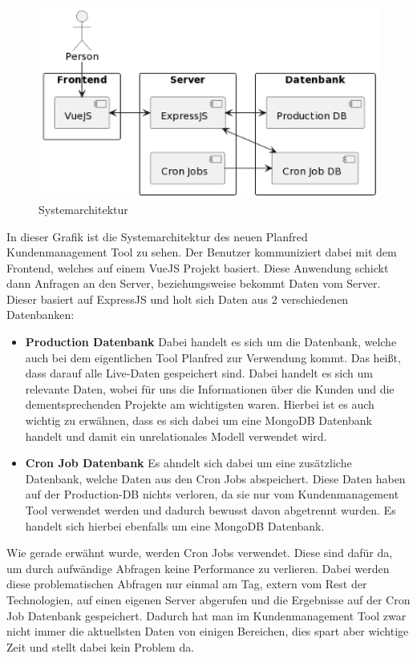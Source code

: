 \begin{figure}[h!]
    \centering
    \includegraphics[width=1\textwidth]{pics/diplomarbeit-architektur.png}
    \caption{Systemarchitektur}
    \label{fig:mesh1}
\end{figure}

In dieser Grafik ist die Systemarchitektur des neuen Planfred Kundenmanagement Tool zu sehen. Der Benutzer kommuniziert dabei mit dem Frontend, welches auf einem VueJS Projekt basiert. Diese Anwendung schickt dann Anfragen an den Server, beziehungsweise bekommt Daten vom Server. Dieser basiert auf ExpressJS und holt sich Daten aus 2 verschiedenen Datenbanken:

\begin{itemize}
    \item \textbf{Production Datenbank}
        \newline
        Dabei handelt es sich um die Datenbank, welche auch bei dem eigentlichen Tool Planfred zur Verwendung kommt. Das heißt, dass darauf alle Live-Daten gespeichert sind. Dabei handelt es sich um relevante Daten, wobei für uns die Informationen über die Kunden und die dementsprechenden Projekte am wichtigsten waren.
        Hierbei ist es auch wichtig zu erwähnen, dass es sich dabei um eine MongoDB Datenbank handelt und damit ein unrelationales Modell verwendet wird.

    \item \textbf{Cron Job Datenbank}
        \newline
        Es ahndelt sich dabei um eine zusätzliche Datenbank, welche Daten aus den Cron Jobs abspeichert. Diese Daten haben auf der Production-DB nichts verloren, da sie nur vom Kundenmanagement Tool verwendet werden und dadurch bewusst davon abgetrennt wurden.
        Es handelt sich hierbei ebenfalls um eine MongoDB Datenbank.
\end{itemize}

Wie gerade erwähnt wurde, werden Cron Jobs verwendet. Diese sind dafür da, um durch aufwändige Abfragen keine Performance zu verlieren. Dabei werden diese problematischen Abfragen nur einmal am Tag, extern vom Rest der Technologien, auf einen eigenen Server abgerufen und die Ergebnisse auf der Cron Job Datenbank gespeichert. Dadurch hat man im Kundenmanagement Tool zwar nicht immer die aktuellsten Daten von einigen Bereichen, dies spart aber wichtige Zeit und stellt dabei kein Problem da.

